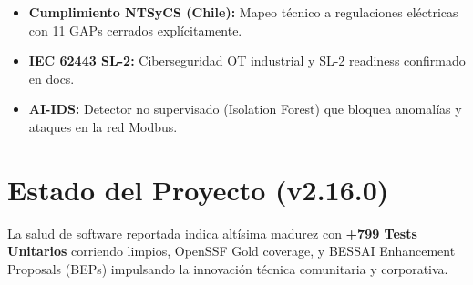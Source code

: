 \documentclass[11pt,a4paper]{article}
\begin{document}
\begin{itemize}
    \item \textbf{Cumplimiento NTSyCS (Chile):} Mapeo técnico a regulaciones eléctricas con 11 GAPs cerrados explícitamente.
    \item \textbf{IEC 62443 SL-2:} Ciberseguridad OT industrial y SL-2 readiness confirmado en docs.
    \item \textbf{AI-IDS:} Detector no supervisado (Isolation Forest) que bloquea anomalías y ataques en la red Modbus.
\end{itemize}

\section{Estado del Proyecto (v2.16.0)}
La salud de software reportada indica altísima madurez con \textbf{+799 Tests Unitarios} corriendo limpios, OpenSSF Gold coverage, y BESSAI Enhancement Proposals (BEPs) impulsando la innovación técnica comunitaria y corporativa.
\end{document}
